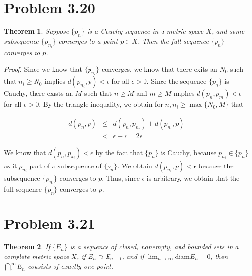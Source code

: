 \documentclass[psamsfonts]{amsart}
\newtheorem{thm}{Theorem}[section]
\theoremstyle{definition}
\theoremstyle{remark}
\numberwithin{equation}{section}
\begin{document}
\section{Problem 3.20}
\begin{thm}
Suppose $\{ p_n \}$ is a Cauchy sequence in a metric space $X$, and some subsequence $\{ p_{n_i} \}$ converges to a point $p \in X$. Then the full sequence $\{ p_n \}$ converges to $p$. 
\end{thm}

\begin{proof}
Since we know that $\{ p_{n_i} \}$ converges, we know that there exits an $N_0$ such that $n_i \geq N_0$ implies $d(p_{n_i}, p) < \epsilon$ for all $\epsilon > 0$. Since the sequence $\{ p_n \}$ is Cauchy, there exists an $M$ such that $n \geq M$ and $m \geq M$ implies $d(p_n, p_m) < \epsilon$ for all $\epsilon > 0$. By the triangle inequality, we obtain for $n, n_i \geq \max \{ N_0, M \} $ that

\begin{eqnarray}
d(p_n,p) &\leq& d(p_n, p_{n_i}) + d(p_{n_i},p) \\
&<& \epsilon + \epsilon = 2 \epsilon \nonumber
\end{eqnarray}

We know that $d(p_n, p_{n_i} ) < \epsilon$ by the fact that $\{ p_n \}$ is Cauchy, because $p_{n_i} \in \{ p_n \}$ as it $p_{n_i}$ part of a subsequence of $\{ p_n \}$. We obtain $d(p_{n_i},p) < \epsilon$ because the subsequence $\{ p_{n_i} \}$ converges to $p$. Thus, since $\epsilon$ is arbitrary, we obtain that the full sequence $\{ p_n \}$ converges to $p$.
\end{proof}

\section{Problem 3.21}
\begin{thm}
If $\{ E_n \}$ is a sequence of closed, nonempty, and bounded sets in a complete metric space $X$, if $E_n \supset E_{n+1}$, and if $\lim_{n \to \infty} \text{diam} E_n = 0$, then $\bigcap_1^\infty E_n$ consists of exactly one point. 
\end{thm}
\end{document}
